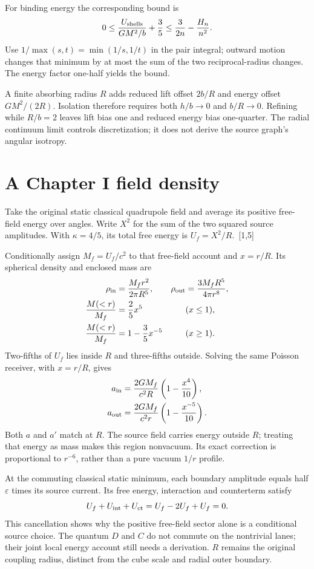 \documentclass[10pt,twocolumn,letterpaper]{article}
\begin{document}
For binding energy the corresponding bound is
\[
0\leq\frac{U_{\rm shells}}{GM^2/b}+\frac35\leq\frac3{2n}-\frac{H_n}{n^2}.
\]
Use $1/\max(s,t)=\min(1/s,1/t)$ in the pair integral; outward motion changes that minimum by at most the sum of the two reciprocal-radius changes. The energy factor one-half yields the bound.

A finite absorbing radius $R$ adds reduced lift offset $2b/R$ and energy offset $GM^2/(2R)$. Isolation therefore requires both $h/b\to0$ and $b/R\to0$. Refining while $R/b=2$ leaves lift bias one and reduced energy bias one-quarter. The radial continuum limit controls discretization; it does not derive the source graph's angular isotropy.

\section{A Chapter I field density}
Take the original static classical quadrupole field and average its positive free-field energy over angles. Write $X^2$ for the sum of the two squared source amplitudes. With $\kappa=4/5$, its total free energy is $U_f=X^2/R$.~[1,5]

Conditionally assign $M_f=U_f/c^2$ to that free-field account and $x=r/R$. Its spherical density and enclosed mass are
\[
\begin{aligned}
\rho_{\rm in}&=\frac{M_fr^2}{2\pi R^5},&\rho_{\rm out}&=\frac{3M_fR^5}{4\pi r^8},\\
\frac{M(<r)}{M_f}&=\frac25x^5&& (x\leq1),\\
\frac{M(<r)}{M_f}&=1-\frac35x^{-5}&& (x\geq1).
\end{aligned}
\]
Two-fifths of $U_f$ lies inside $R$ and three-fifths outside. Solving the same Poisson receiver, with $x=r/R$, gives
\[
\begin{aligned}
a_{\rm in}&=\frac{2GM_f}{c^2R}\left(1-\frac{x^4}{10}\right),\\
a_{\rm out}&=\frac{2GM_f}{c^2r}\left(1-\frac{x^{-5}}{10}\right).
\end{aligned}
\]
Both $a$ and $a'$ match at $R$. The source field carries energy outside $R$; treating that energy as mass makes this region nonvacuum. Its exact correction is proportional to $r^{-6}$, rather than a pure vacuum $1/r$ profile.

At the commuting classical static minimum, each boundary amplitude equals half $\varepsilon$ times its source current. Its free energy, interaction and counterterm satisfy
\[
U_f+U_{\rm int}+U_{\rm ct}=U_f-2U_f+U_f=0.
\]
This cancellation shows why the positive free-field sector alone is a conditional source choice. The quantum $D$ and $C$ do not commute on the nontrivial lanes; their joint local energy account still needs a derivation. $R$ remains the original coupling radius, distinct from the cube scale and radial outer boundary.
\end{document}
